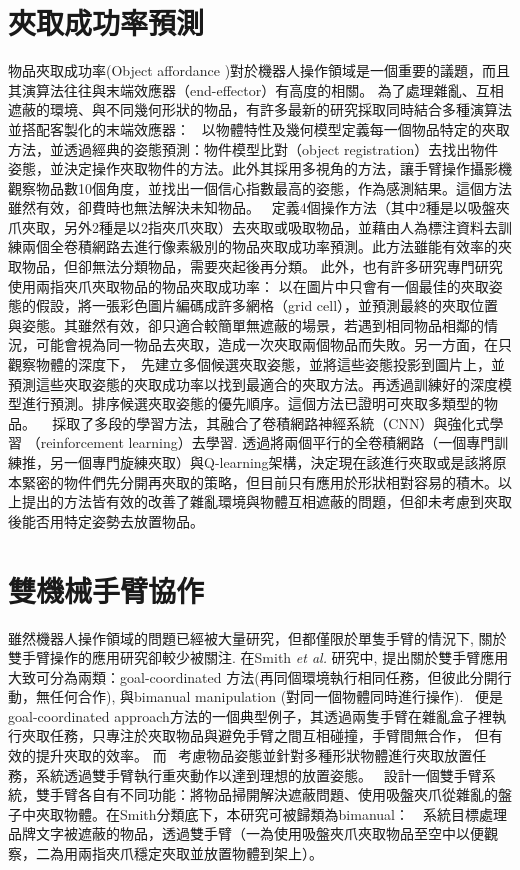 \section{夾取成功率預測}
物品夾取成功率(Object affordance )對於機器人操作領域是一個重要的議題，而且其演算法往往與末端效應器（end-effector）有高度的相關。
為了處理雜亂、互相遮蔽的環境、與不同幾何形狀的物品，有許多最新的研究採取同時結合多種演算法並搭配客製化的末端效應器：
~\cite{zeng2016multi}以物體特性及幾何模型定義每一個物品特定的夾取方法，並透過經典的姿態預測：物件模型比對（object registration）去找出物件姿態，並決定操作夾取物件的方法。此外其採用多視角的方法，讓手臂操作攝影機觀察物品數10個角度，並找出一個信心指數最高的姿態，作為感測結果。這個方法雖然有效，卻費時也無法解決未知物品。
~\cite{zeng2018robotic}定義4個操作方法（其中2種是以吸盤夾爪夾取，另外2種是以2指夾爪夾取）去夾取或吸取物品，並藉由人為標注資料去訓練兩個全卷積網路去進行像素級別的物品夾取成功率預測。此方法雖能有效率的夾取物品，但卻無法分類物品，需要夾起後再分類。
此外，也有許多研究專門研究使用兩指夾爪夾取物品的物品夾取成功率： \cite{redmon2015real} 以在圖片中只會有一個最佳的夾取姿態的假設，將一張彩色圖片編碼成許多網格（grid cell），並預測最終的夾取位置與姿態。其雖然有效，卻只適合較簡單無遮蔽的場景，若遇到相同物品相鄰的情況，可能會視為同一物品去夾取，造成一次夾取兩個物品而失敗。另一方面，在只觀察物體的深度下，~\cite{mahler2017dex}先建立多個候選夾取姿態，並將這些姿態投影到圖片上，並預測這些夾取姿態的夾取成功率以找到最適合的夾取方法。再透過訓練好的深度模型進行預測。排序候選夾取姿態的優先順序。這個方法已證明可夾取多類型的物品。
~\cite{pinto2016supersizing} 採取了多段的學習方法，其融合了卷積網路神經系統（CNN）與強化式學習 （reinforcement learning）去學習. \cite{zeng2018learning}透過將兩個平行的全卷積網路（一個專門訓練推，另一個專門旋練夾取）與Q-learning架構，決定現在該進行夾取或是該將原本緊密的物件們先分開再夾取的策略，但目前只有應用於形狀相對容易的積木。以上提出的方法皆有效的改善了雜亂環境與物體互相遮蔽的問題，但卻未考慮到夾取後能否用特定姿勢去放置物品。

\section{雙機械手臂協作}
雖然機器人操作領域的問題已經被大量研究，但都僅限於單隻手臂的情況下, 關於雙手臂操作的應用研究卻較少被關注. 在Smith \textit{et al.} \cite{smith2012dual}研究中,
提出關於雙手臂應用大致可分為兩類：goal-coordinated 方法(再同個環境執行相同任務，但彼此分開行動，無任何合作), 與bimanual manipulation (對同一個物體同時進行操作).
~\cite{schwarz2018fast}便是goal-coordinated approach方法的一個典型例子，其透過兩隻手臂在雜亂盒子裡執行夾取任務，只專注於夾取物品與避免手臂之間互相碰撞，手臂間無合作，
但有效的提升夾取的效率。 而~\cite{harada2012pick} 考慮物品姿態並針對多種形狀物體進行夾取放置任務，系統透過雙手臂執行重夾動作以達到理想的放置姿態。
~\cite{miyazaki2017object}設計一個雙手臂系統，雙手臂各自有不同功能：將物品掃開解決遮蔽問題、使用吸盤夾爪從雜亂的盤子中夾取物體。在Smith分類底下，本研究可被歸類為bimanual：　系統目標處理品牌文字被遮蔽的物品，透過雙手臂（一為使用吸盤夾爪夾取物品至空中以便觀察，二為用兩指夾爪穩定夾取並放置物體到架上）。

